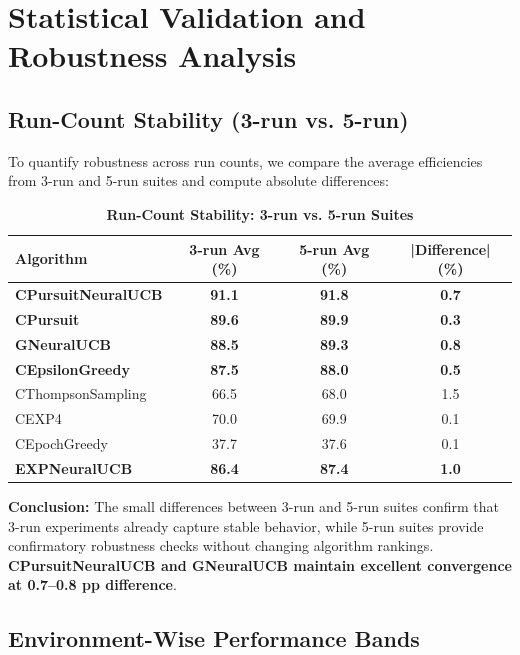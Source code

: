 \documentclass[12pt,a4paper]{article}
\newcommand{\success}[1]{\textcolor{successcolor}{\textbf{#1}}}
\newcommand{\legacy}[1]{\textcolor{legacycolor}{\textbf{#1}}}
\newcommand{\neural}[1]{\textcolor{neuralcolor}{\textbf{#1}}}
\begin{document}
\newpage
\section{Statistical Validation and Robustness Analysis}

\subsection{Run-Count Stability (3-run vs. 5-run)}

To quantify robustness across run counts, we compare the average efficiencies from 3-run and 5-run suites and compute absolute differences:

\begin{table}[H]
\centering
\caption{\success{Run-Count Stability: 3-run vs. 5-run Suites}}
\begin{tabular}{|l|c|c|c|}
\hline
\textbf{Algorithm} & \textbf{3-run Avg (\%)} & \textbf{5-run Avg (\%)} & \textbf{|Difference| (\%)} \\
\hline
\hline
\neural{CPursuitNeuralUCB}  & \neural{91.1}     & \neural{91.8}     & \neural{0.7} \\
\success{CPursuit}        & \success{89.6} & \success{89.9} & \success{0.3} \\
\neural{GNeuralUCB}         & \neural{88.5} & \neural{89.3} & \neural{0.8} \\
\success{CEpsilonGreedy} & \success{87.5} & \success{88.0} & \success{0.5} \\
CThompsonSampling        & 66.5          & 68.0          & 1.5 \\
CEXP4                    & 70.0          & 69.9          & 0.1 \\
CEpochGreedy             & 37.7          & 37.6          & 0.1 \\
\legacy{EXPNeuralUCB}    & \legacy{86.4} & \legacy{87.4} & \legacy{1.0} \\
\hline
\end{tabular}
\end{table}

\textbf{Conclusion:} The small differences between 3-run and 5-run suites confirm that 3-run experiments already capture stable behavior, while 5-run suites provide confirmatory robustness checks without changing algorithm rankings. \neural{CPursuitNeuralUCB and GNeuralUCB maintain excellent convergence at 0.7--0.8 pp difference}.

\subsection{Environment-Wise Performance Bands}
\end{document}
